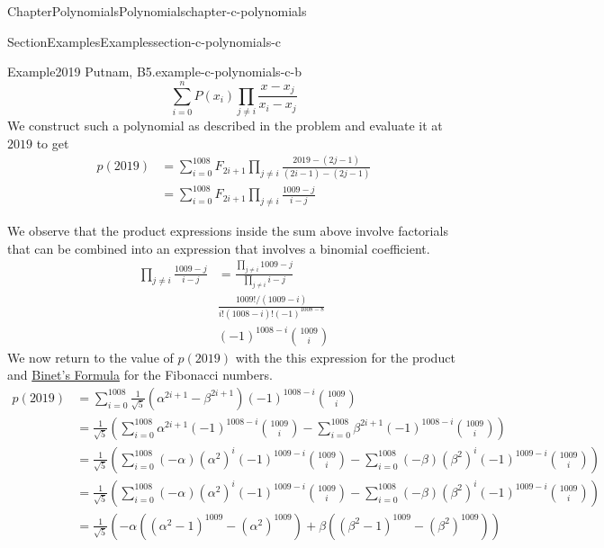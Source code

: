 \documentclass[oneside,10pt,]{book}
\numberwithin{equation}{section}
\begin{document}
\begin{chapterptx}{Chapter}{Polynomials}{}{Polynomials}{}{}{chapter-c-polynomials}
\begin{sectionptx}{Section}{Examples}{}{Examples}{}{}{section-c-polynomials-c}
\begin{example}{Example}{2019 Putnam, B5.}{example-c-polynomials-c-b}
\begin{equation*}
\sum_{i=0}^n P(x_i) \prod_{j \neq i} \frac{x-x_j}{x_i-x_j}
\end{equation*}
We construct such a polynomial as described in the problem and evaluate it at \(2019\) to get%
\begin{equation*}
\begin{split}
p(2019) &=\sum_{i=0}^{1008} F_{2i+1} \prod_{j \neq i} \frac{2019-(2j-1)}{(2i-1)-(2j-1)}\\
&=\sum_{i=0}^{1008} F_{2i+1} \prod_{j \neq i} \frac{1009-j}{i-j}
\end{split}
\end{equation*}
%
\par
We observe that the product expressions inside the sum above involve factorials that can be combined into an expression that involves a binomial coefficient.%
\begin{equation*}
\begin{split}
\prod_{j \neq i} \frac{1009-j}{i-j}&=\frac{\prod_{j \neq i} {1009-j}}
{\prod_{j \neq i} {i-j}}\\
&\frac{1009!/(1009-i)}{i! (1008-i)! (-1)^{1008-8}}\\
& (-1)^{1008-i}\binom{1009}{i}
\end{split}
\end{equation*}
We now return to the value of \(p(2019)\) with the this expression for the product and \hyperlink{exercise-binet}{Binet's Formula} for the Fibonacci numbers.%
\begin{equation*}
\begin{split}
p(2019) &=\sum_{i=0}^{1008} \frac{1}{\sqrt{5}}(\alpha^{2i+1}-\beta^{2i+1}) 
(-1)^{1008-i}\binom{1009}{i}    \\
&=\frac{1}{\sqrt{5}}\left(    
\sum_{i=0}^{1008} \alpha^{2i+1}
(-1)^{1008-i}\binom{1009}{i}-
\sum_{i=0}^{1008} \beta^{2i+1}
(-1)^{1008-i}\binom{1009}{i}
\right)\\
&=\frac{1}{\sqrt{5}}\left(    
\sum_{i=0}^{1008}(-\alpha) (\alpha^2)^i
(-1)^{1009-i}\binom{1009}{i}-
\sum_{i=0}^{1008}(-\beta) (\beta^2)^i
(-1)^{1009-i}\binom{1009}{i}
\right)\\
&=\frac{1}{\sqrt{5}}\left(    
\sum_{i=0}^{1008}(-\alpha) (\alpha^2)^i
(-1)^{1009-i}\binom{1009}{i}-
\sum_{i=0}^{1008}(-\beta) (\beta^2)^i
(-1)^{1009-i}\binom{1009}{i}
\right)\\
&=\frac{1}{\sqrt{5}}\left(-\alpha((\alpha^2-1)^{1009} -(\alpha^2)^{1009} )
+\beta  ((\beta^2-1)^{1009} -(\beta^2)^{1009} )
\right)\\

\end{split}
\end{equation*}
\end{example}
\end{sectionptx}
\end{chapterptx}
\end{document}
